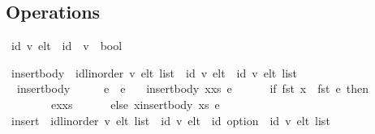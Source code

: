 \documentclass[acmlarge,review,anonymous]{acmart}\settopmatter{printfolios=true}
\begin{document}
\subsection{Operations}
\label{sect.rga.operations}

\begin{isabellebody}
\isanewline
{}\isamarkupfalse%
\ {\isacharparenleft}{\isacharprime}id{\isacharcomma}\ {\isacharprime}v{\isacharparenright}\ elt\ {\isacharequal}\ {\isachardoublequoteopen}{\isacharprime}id\ {\isasymtimes}\ {\isacharprime}v\ {\isasymtimes}\ bool{\isachardoublequoteclose}%
\end{isabellebody}


\begin{isabellebody}
\isanewline
{}\isamarkupfalse%
\ insert{\isacharunderscore}body\ {\isacharcolon}{\isacharcolon}\ {\isachardoublequoteopen}{\isacharparenleft}{\isacharprime}id{\isacharcolon}{\isacharcolon}{\isacharbraceleft}linorder{\isacharbraceright}{\isacharcomma}\ {\isacharprime}v{\isacharparenright}\ elt\ list\ {\isasymRightarrow}\ {\isacharparenleft}{\isacharprime}id{\isacharcomma}\ {\isacharprime}v{\isacharparenright}\ elt\ {\isasymRightarrow}\ {\isacharparenleft}{\isacharprime}id{\isacharcomma}\ {\isacharprime}v{\isacharparenright}\ elt\ list{\isachardoublequoteclose}\ \isanewline
\ \ {\isachardoublequoteopen}insert{\isacharunderscore}body\ {\isacharbrackleft}{\isacharbrackright}\ \ \ \ \ e\ {\isacharequal}\ {\isacharbrackleft}e{\isacharbrackright}{\isachardoublequoteclose}\ {\isacharbar}\isanewline
\ \ {\isachardoublequoteopen}insert{\isacharunderscore}body\ {\isacharparenleft}x{\isacharhash}xs{\isacharparenright}\ e\ {\isacharequal}\isanewline
\ \ \ \ \ {\isacharparenleft}if\ fst\ x\ {\isacharless}\ fst\ e\ then\isanewline
\ \ \ \ \ \ \ \ e{\isacharhash}x{\isacharhash}xs\isanewline
\ \ \ \ \ \ else\ x{\isacharhash}insert{\isacharunderscore}body\ xs\ e{\isacharparenright}{\isachardoublequoteclose}\isanewline
\isanewline
{}\isamarkupfalse%
\ insert\ {\isacharcolon}{\isacharcolon}\ {\isachardoublequoteopen}{\isacharparenleft}{\isacharprime}id{\isacharcolon}{\isacharcolon}{\isacharbraceleft}linorder{\isacharbraceright}{\isacharcomma}\ {\isacharprime}v{\isacharparenright}\ elt\ list\ {\isasymRightarrow}\ {\isacharparenleft}{\isacharprime}id{\isacharcomma}\ {\isacharprime}v{\isacharparenright}\ elt\ {\isasymRightarrow}\ {\isacharprime}id\ option\ {\isasymrightharpoonup}\ {\isacharparenleft}{\isacharprime}id{\isacharcomma}\ {\isacharprime}v{\isacharparenright}\ elt\ list{\isachardoublequoteclose}\ \isanewline

\end{isabellebody}
\end{document}
